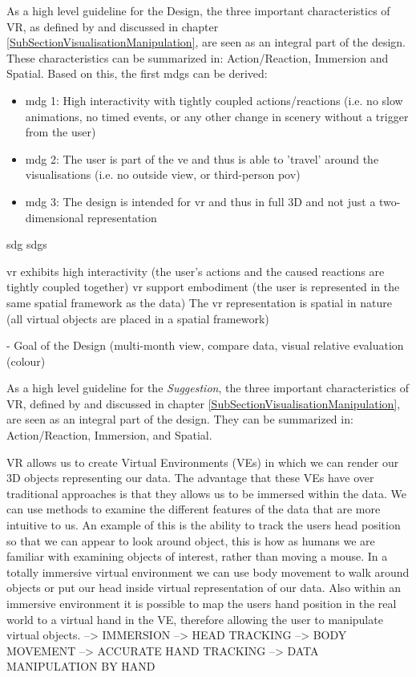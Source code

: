 As a high level guideline for the Design, the three important characteristics of VR, as defined by \cite{Stone1994} and discussed in chapter \ref{SubSectionVisualisationManipulation}, are seen as an integral part of the design. These characteristics can be summarized in: Action/Reaction, Immersion and Spatial. Based on this, the first \glspl{mdg} can be derived:
\begin{itemize}[noitemsep,nolistsep]
	\item \gls{mdg} 1: High interactivity with tightly coupled actions/reactions (i.e. no slow animations, no timed events, or any other change in scenery without a trigger from the user)
	\item \gls{mdg} 2: The user is part of the \gls{ve} and thus is able to 'travel' around the visualisations (i.e. no outside view, or third-person \gls{pov})
	\item \gls{mdg} 3: The design is intended for \gls{vr} and thus in full 3D and not just a two-dimensional representation
\end{itemize}



\gls{sdg}
\glspl{sdg}

 \gls{vr} exhibits high interactivity (the user's actions and the caused reactions are tightly coupled together)
 \gls{vr} support embodiment (the user is represented  in the same spatial framework as the data)
 The \gls{vr} representation is spatial in nature (all virtual objects are placed in a spatial framework)

- Goal of the Design (multi-month view, compare data, visual relative evaluation (colour)

As a high level guideline for the \textit{Suggestion}, the three important characteristics of VR, defined by \cite{Stone1994} and discussed in chapter \ref{SubSectionVisualisationManipulation}, are seen as an integral part of the design. They can be summarized in: Action/Reaction, Immersion, and Spatial. \newline




VR allows us to create Virtual Environments (VEs) in which we can render our 3D objects representing our data. The advantage that these VEs have over traditional approaches is that they allows us to be immersed within the data. We can use methods to examine the different features of the data that are more intuitive to us. An example of this is the ability to track the users head position so that we can appear to look around object, this is how as humans we are familiar with examining objects of interest, rather than moving a mouse. In a totally immersive virtual environment we can use body movement to walk around objects or put our head inside virtual representation of our data. Also within an immersive environment it is possible to map the users hand position in the real world to a virtual hand in the VE, therefore allowing the user to manipulate virtual objects.
\cite{Jamieson2007}
--> IMMERSION
--> HEAD TRACKING
--> BODY MOVEMENT
--> ACCURATE HAND TRACKING
--> DATA MANIPULATION BY HAND




